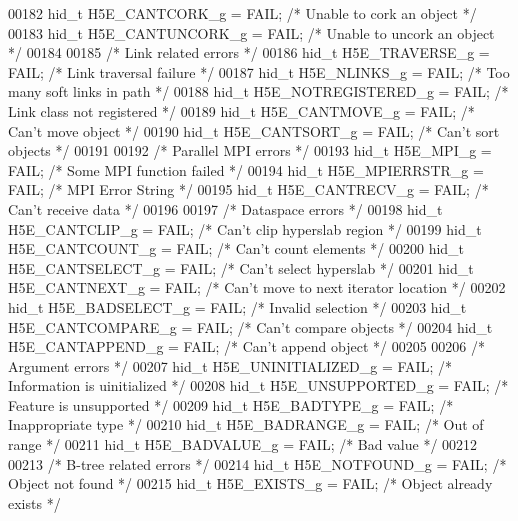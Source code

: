 \begin{DoxyCode}
00182 hid\_t H5E\_CANTCORK\_g       = FAIL;      \textcolor{comment}{/* Unable to cork an object */}
00183 hid\_t H5E\_CANTUNCORK\_g     = FAIL;      \textcolor{comment}{/* Unable to uncork an object */}
00184 
00185 \textcolor{comment}{/* Link related errors */}
00186 hid\_t H5E\_TRAVERSE\_g       = FAIL;      \textcolor{comment}{/* Link traversal failure */}
00187 hid\_t H5E\_NLINKS\_g         = FAIL;      \textcolor{comment}{/* Too many soft links in path */}
00188 hid\_t H5E\_NOTREGISTERED\_g  = FAIL;      \textcolor{comment}{/* Link class not registered */}
00189 hid\_t H5E\_CANTMOVE\_g       = FAIL;      \textcolor{comment}{/* Can't move object */}
00190 hid\_t H5E\_CANTSORT\_g       = FAIL;      \textcolor{comment}{/* Can't sort objects */}
00191 
00192 \textcolor{comment}{/* Parallel MPI errors */}
00193 hid\_t H5E\_MPI\_g            = FAIL;      \textcolor{comment}{/* Some MPI function failed */}
00194 hid\_t H5E\_MPIERRSTR\_g      = FAIL;      \textcolor{comment}{/* MPI Error String */}
00195 hid\_t H5E\_CANTRECV\_g       = FAIL;      \textcolor{comment}{/* Can't receive data */}
00196 
00197 \textcolor{comment}{/* Dataspace errors */}
00198 hid\_t H5E\_CANTCLIP\_g       = FAIL;      \textcolor{comment}{/* Can't clip hyperslab region */}
00199 hid\_t H5E\_CANTCOUNT\_g      = FAIL;      \textcolor{comment}{/* Can't count elements */}
00200 hid\_t H5E\_CANTSELECT\_g     = FAIL;      \textcolor{comment}{/* Can't select hyperslab */}
00201 hid\_t H5E\_CANTNEXT\_g       = FAIL;      \textcolor{comment}{/* Can't move to next iterator location */}
00202 hid\_t H5E\_BADSELECT\_g      = FAIL;      \textcolor{comment}{/* Invalid selection */}
00203 hid\_t H5E\_CANTCOMPARE\_g    = FAIL;      \textcolor{comment}{/* Can't compare objects */}
00204 hid\_t H5E\_CANTAPPEND\_g     = FAIL;      \textcolor{comment}{/* Can't append object */}
00205 
00206 \textcolor{comment}{/* Argument errors */}
00207 hid\_t H5E\_UNINITIALIZED\_g  = FAIL;      \textcolor{comment}{/* Information is uinitialized */}
00208 hid\_t H5E\_UNSUPPORTED\_g    = FAIL;      \textcolor{comment}{/* Feature is unsupported */}
00209 hid\_t H5E\_BADTYPE\_g        = FAIL;      \textcolor{comment}{/* Inappropriate type */}
00210 hid\_t H5E\_BADRANGE\_g       = FAIL;      \textcolor{comment}{/* Out of range */}
00211 hid\_t H5E\_BADVALUE\_g       = FAIL;      \textcolor{comment}{/* Bad value */}
00212 
00213 \textcolor{comment}{/* B-tree related errors */}
00214 hid\_t H5E\_NOTFOUND\_g       = FAIL;      \textcolor{comment}{/* Object not found */}
00215 hid\_t H5E\_EXISTS\_g         = FAIL;      \textcolor{comment}{/* Object already exists */}

\end{DoxyCode}
